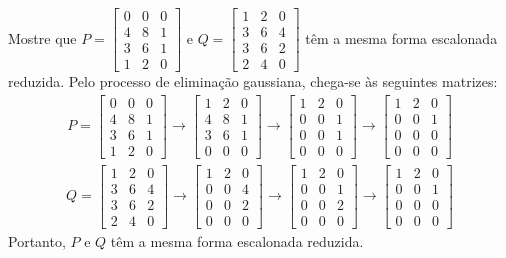 \documentclass[12pt,a4paper]{article}
\begin{document}
\begin{ExerciseList}
\Exercise[title={2,0}] Mostre que $P = \begin{bmatrix}
0 & 0 & 0 \\
4 & 8 & 1 \\
3 & 6 & 1 \\
1 & 2 & 0
\end{bmatrix}$ e $Q = \begin{bmatrix}
1 & 2 & 0 \\
3 & 6 & 4 \\
3 & 6 & 2 \\
2 & 4 & 0
\end{bmatrix}$ têm a mesma forma escalonada reduzida.
\Answer Pelo processo de eliminação gaussiana, chega-se às seguintes matrizes:
\begin{align*}
P =
\begin{bmatrix}
0 & 0 & 0 \\
4 & 8 & 1 \\
3 & 6 & 1 \\
1 & 2 & 0
\end{bmatrix}
\rightarrow
\begin{bmatrix}
1 & 2 & 0 \\
4 & 8 & 1 \\
3 & 6 & 1 \\
0 & 0 & 0
\end{bmatrix}
\rightarrow
\begin{bmatrix}
1 & 2 & 0 \\
0 & 0 & 1 \\
0 & 0 & 1 \\
0 & 0 & 0
\end{bmatrix}
\rightarrow
\begin{bmatrix}
1 & 2 & 0 \\
0 & 0 & 1 \\
0 & 0 & 0 \\
0 & 0 & 0
\end{bmatrix}
\end{align*}
\begin{align*}
Q =
\begin{bmatrix}
1 & 2 & 0 \\
3 & 6 & 4 \\
3 & 6 & 2 \\
2 & 4 & 0
\end{bmatrix}
\rightarrow
\begin{bmatrix}
1 & 2 & 0 \\
0 & 0 & 4 \\
0 & 0 & 2 \\
0 & 0 & 0
\end{bmatrix}
\rightarrow
\begin{bmatrix}
1 & 2 & 0 \\
0 & 0 & 1 \\
0 & 0 & 2 \\
0 & 0 & 0
\end{bmatrix}
\rightarrow
\begin{bmatrix}
1 & 2 & 0 \\
0 & 0 & 1 \\
0 & 0 & 0 \\
0 & 0 & 0
\end{bmatrix}
\end{align*}
Portanto, $P$ e $Q$ têm a mesma forma escalonada reduzida.


\end{ExerciseList}
\end{document}
